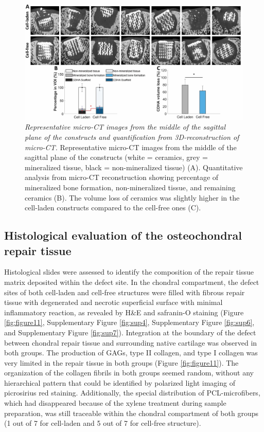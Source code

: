 \documentclass[twocolumn, empirical, authordate, issue]{jote-new-article}
\begin{document}
\begin{figure}[t!]
\begin{fullwidth}
\centering \includegraphics[width=\textwidth+\fullwidthlen]{media/image10.jpg}
\caption{\emph{Representative micro-CT images from the middle of the sagittal plane of the constructs and quantification from 3D-reconstruction of micro-CT.} Representative micro-CT images from the middle of the sagittal plane of the constructs (white = ceramics, grey = mineralized tissue, black = non-mineralized tissue) (A). Quantitative analysis from micro-CT reconstruction showing percentage of mineralized bone formation, non-mineralized tissue, and remaining ceramics (B). The volume loss of ceramics was slightly higher in the cell-laden constructs compared to the cell-free ones (C).}
\label{fig:figure10}
\end{fullwidth}
\end{figure}

\subsection{Histological evaluation of the osteochondral repair tissue} 

Histological slides were assessed to identify the composition of the repair tissue matrix deposited within the defect site. In the chondral compartment, the defect sites of both cell-laden and cell-free structures were filled with fibrous repair tissue with degenerated and necrotic superficial surface with minimal inflammatory reaction, as revealed by H\&E and safranin-O staining (Figure \ref{fig:figure11}, Supplementary Figure \ref{fig:sup4}, Supplementary Figure \ref{fig:sup6}, and Supplementary Figure \ref{fig:sup7}). Integration at the boundary of the defect between chondral repair tissue and surrounding native cartilage was observed in both groups. The production of GAGs, type II collagen, and type I collagen was very limited in the repair tissue in both groups (Figure \ref{fig:figure11}). The organization of the collagen fibrils in both groups seemed random, without any hierarchical pattern that could be identified by polarized light imaging of picrosirius red staining. Additionally, the special distribution of PCL-microfibers, which had disappeared because of the xylene treatment during sample preparation, was still traceable within the chondral compartment of both groups (1 out of 7 for cell-laden and 5 out of 7 for cell-free structure).
\end{document}
